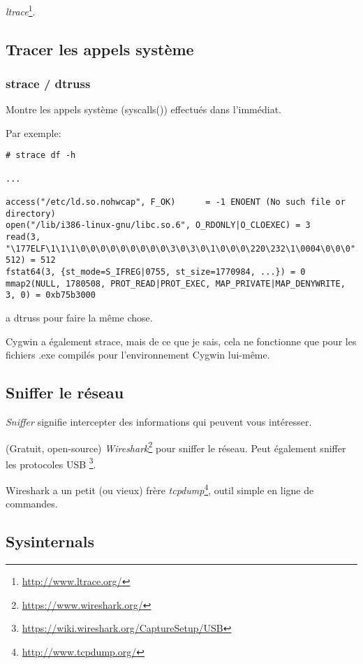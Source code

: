 \emph{ltrace}\footnote{\url{http://www.ltrace.org/}}.

\subsection{Tracer les appels système}

\label{strace}
\subsubsection{strace / dtruss}

Montre les appels système (syscalls()) effectués dans l'immédiat.

Par exemple:

\begin{lstlisting}
# strace df -h

...

access("/etc/ld.so.nohwcap", F_OK)      = -1 ENOENT (No such file or directory)
open("/lib/i386-linux-gnu/libc.so.6", O_RDONLY|O_CLOEXEC) = 3
read(3, "\177ELF\1\1\1\0\0\0\0\0\0\0\0\0\3\0\3\0\1\0\0\0\220\232\1\0004\0\0\0"..., 512) = 512
fstat64(3, {st_mode=S_IFREG|0755, st_size=1770984, ...}) = 0
mmap2(NULL, 1780508, PROT_READ|PROT_EXEC, MAP_PRIVATE|MAP_DENYWRITE, 3, 0) = 0xb75b3000
\end{lstlisting}

\myindex{\MacOSX}
\MacOSX a dtruss pour faire la même chose.

Cygwin a également strace, mais de ce que je sais, cela ne fonctionne que pour les fichiers .exe
compilés pour l'environnement Cygwin lui-même.

\subsection{Sniffer le réseau}

\emph{Sniffer} signifie intercepter des informations qui peuvent vous intéresser.

(Gratuit, open-source) \emph{Wireshark}\footnote{\url{https://www.wireshark.org/}} pour sniffer le réseau.
Peut également sniffer les protocoles USB \footnote{\url{https://wiki.wireshark.org/CaptureSetup/USB}}.

Wireshark a un petit (ou vieux) frère \emph{tcpdump}\footnote{\url{http://www.tcpdump.org/}}, outil simple en ligne de commandes.

\subsection{Sysinternals}

